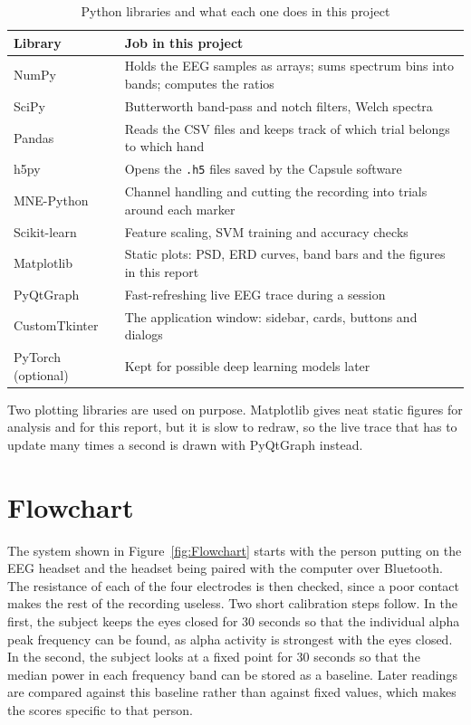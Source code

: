 \begin{table}[!htbp]
\centering
\caption{Python libraries and what each one does in this project}
\label{tab:sw_libs}
\begin{tabular}{|l|p{10cm}|}
\hline
\textbf{Library} & \textbf{Job in this project} \\
\hline
NumPy & Holds the EEG samples as arrays; sums spectrum bins into bands; computes the ratios \\
\hline
SciPy & Butterworth band-pass and notch filters, Welch spectra \\
\hline
Pandas & Reads the CSV files and keeps track of which trial belongs to which hand \\
\hline
h5py & Opens the \texttt{.h5} files saved by the Capsule software \\
\hline
MNE-Python \cite{gramfort2013mne} & Channel handling and cutting the recording into trials around each marker \\
\hline
Scikit-learn \cite{pedregosa2011sklearn} & Feature scaling, SVM training and accuracy checks \\
\hline
Matplotlib & Static plots: PSD, ERD curves, band bars and the figures in this report \\
\hline
PyQtGraph & Fast-refreshing live EEG trace during a session \\
\hline
CustomTkinter & The application window: sidebar, cards, buttons and dialogs \\
\hline
PyTorch (optional) & Kept for possible deep learning models later \\
\hline
\end{tabular}
\end{table}

Two plotting libraries are used on purpose. Matplotlib gives neat static figures for
analysis and for this report, but it is slow to redraw, so the live trace that has to
update many times a second is drawn with PyQtGraph instead.

\vspace{0.5cm}

\section{Flowchart}
The system shown in Figure~\ref{fig:Flowchart} starts with the person putting on the EEG
headset and the headset being paired with the computer over Bluetooth. The resistance of
each of the four electrodes is then checked, since a poor contact makes the rest of the
recording useless. Two short calibration steps follow. In the first, the subject keeps the
eyes closed for 30 seconds so that the individual alpha peak frequency can be found, as
alpha activity is strongest with the eyes closed. In the second, the subject looks at a
fixed point for 30 seconds so that the median power in each frequency band can be stored
as a baseline. Later readings are compared against this baseline rather than against fixed
values, which makes the scores specific to that person.

